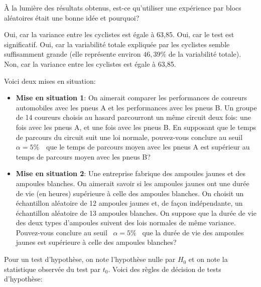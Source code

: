 \begin{questions}
\question[3]\label{AOVblocs3} À la lumière des résultats obtenus, est-ce qu'utiliser une expérience par blocs aléatoires était une bonne idée et pourquoi?

\begin{checkboxes}
\choice Oui, car la variance entre les cyclistes est égale à 63,85.
\choice Oui, car le test est significatif.
\correctchoice Oui, car la variabilité totale expliquée par les cyclistes semble suffisamment grande (elle représente environ $46,39\%$ de la variabilité totale).
\choice Non, car la variance entre les cyclistes est égale à 63,85.
\end{checkboxes}
\newpage




\question\label{2moyregle}

Voici deux mises en situation:
\begin{itemize}
    \item {\bf Mise en situation 1}: On aimerait comparer les performances de coureurs automobiles avec les pneus A et les performances avec les pneus B. Un groupe de 14 coureurs choisis au hasard parcourront un même circuit deux fois: une fois avec les pneus A, et une fois avec les pneus B. En supposant que le temps de parcours du circuit suit une loi normale, pouvez-vous conclure au seuil  $\alpha=5\%$  que le temps de parcours moyen avec les pneus A est supérieur au temps de parcours moyen avec les pneus B?
    \item {\bf Mise en situation 2}: Une entreprise fabrique des ampoules jaunes et des ampoules blanches. On aimerait savoir si les ampoules jaunes ont une durée de vie (en heures) supérieure à celle des ampoules blanches. On choisit un échantillon aléatoire de 12 ampoules jaunes et, de façon indépendante, un échantillon aléatoire de 13 ampoules blanches. On suppose que la durée de vie des deux types d'ampoules suivent des lois normales de même variance. Pouvez-vous conclure au seuil  $\alpha=5\%$  que la durée de vie des ampoules jaunes est supérieure à celle des ampoules blanches?
\end{itemize}

\medskip

Pour un test d'hypothèse, on note l'hypothèse nulle par $H_0$ et on note la statistique observée du test par $t_0$. Voici des règles de décision de tests d'hypothèse:

\begin{itemize}


\end{itemize}
\end{questions}
